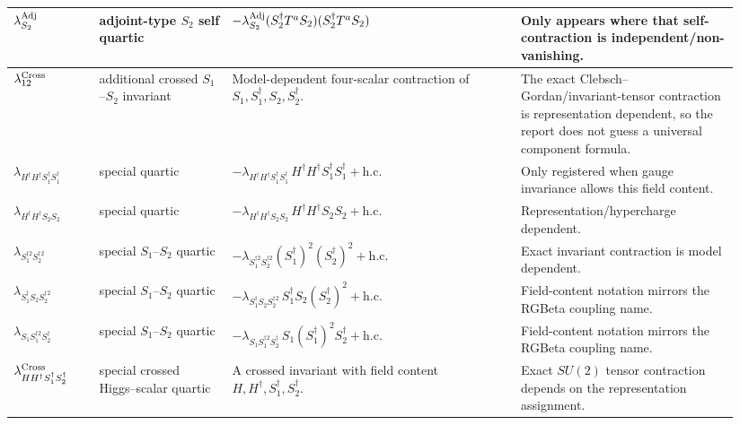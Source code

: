 \documentclass{article}
\begin{document}
\begin{landscape}
\begin{longtable}{@{}p{0.11\linewidth}p{0.17\linewidth}p{0.37\linewidth}p{0.29\linewidth}@{}}
\midrule
$\lambda_{S_2}^{\rm Adj}$ & adjoint-type $S_2$ self quartic & $-\lambda_{S_2}^{\rm Adj}(S_2^\dagger T^a S_2)(S_2^\dagger T^a S_2)$ & Only appears where that self-contraction is independent/non-vanishing. \\
\midrule
$\lambda_{12}^{\rm Cross}$ & additional crossed $S_1$--$S_2$ invariant & Model-dependent four-scalar contraction of $S_1,S_1^\dagger,S_2,S_2^\dagger$. & The exact Clebsch--Gordan/invariant-tensor contraction is representation dependent, so the report does not guess a universal component formula. \\
\midrule
$\lambda_{H^\dagger H^\dagger S_1^\dagger S_1^\dagger}$ & special quartic & $-\lambda_{H^\dagger H^\dagger S_1^\dagger S_1^\dagger}\,H^\dagger H^\dagger S_1^\dagger S_1^\dagger+\mathrm{h.c.}$ & Only registered when gauge invariance allows this field content. \\
\midrule
$\lambda_{H^\dagger H^\dagger S_2 S_2}$ & special quartic & $-\lambda_{H^\dagger H^\dagger S_2 S_2}\,H^\dagger H^\dagger S_2 S_2+\mathrm{h.c.}$ & Representation/hypercharge dependent. \\
\midrule
$\lambda_{S_1^{\dagger 2}S_2^{\dagger 2}}$ & special $S_1$--$S_2$ quartic & $-\lambda_{S_1^{\dagger 2}S_2^{\dagger 2}}(S_1^\dagger)^2(S_2^\dagger)^2+\mathrm{h.c.}$ & Exact invariant contraction is model dependent. \\
\midrule
$\lambda_{S_1^\dagger S_2 S_2^{\dagger 2}}$ & special $S_1$--$S_2$ quartic & $-\lambda_{S_1^\dagger S_2 S_2^{\dagger 2}}\,S_1^\dagger S_2(S_2^\dagger)^2+\mathrm{h.c.}$ & Field-content notation mirrors the RGBeta coupling name. \\
\midrule
$\lambda_{S_1 S_1^{\dagger 2}S_2^\dagger}$ & special $S_1$--$S_2$ quartic & $-\lambda_{S_1 S_1^{\dagger 2}S_2^\dagger}\,S_1(S_1^\dagger)^2S_2^\dagger+\mathrm{h.c.}$ & Field-content notation mirrors the RGBeta coupling name. \\
\midrule
$\lambda_{H H^\dagger S_1^\dagger S_2^\dagger}^{\rm Cross}$ & special crossed Higgs--scalar quartic & A crossed invariant with field content $H,H^\dagger,S_1^\dagger,S_2^\dagger$. & Exact $SU(2)$ tensor contraction depends on the representation assignment. \\
\midrule
\bottomrule
\end{longtable}
\clearpage

\end{landscape}
\end{document}
